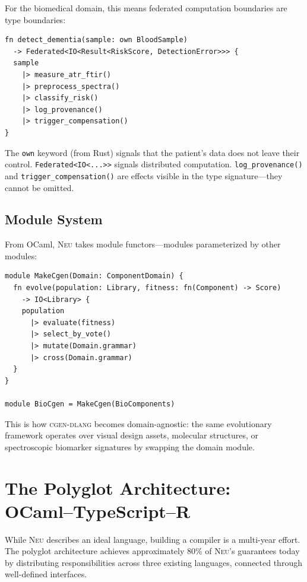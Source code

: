 \documentclass[11pt,letterpaper]{article}
\newcommand{\neu}{\textsc{Neu}}
\newcommand{\cgen}{\textsc{cgen-dlang}}
\begin{document}
For the biomedical domain, this means federated computation boundaries are type boundaries:

\begin{lstlisting}
fn detect_dementia(sample: own BloodSample)
  -> Federated<IO<Result<RiskScore, DetectionError>>> {
  sample
    |> measure_atr_ftir()
    |> preprocess_spectra()
    |> classify_risk()
    |> log_provenance()
    |> trigger_compensation()
}
\end{lstlisting}

The \texttt{own} keyword (from Rust) signals that the patient's data does not leave their control. \texttt{Federated<IO<...>>} signals distributed computation. \texttt{log\_provenance()} and \texttt{trigger\_compensation()} are effects visible in the type signature---they cannot be omitted.

\subsection{Module System}

From OCaml, \neu{} takes module functors---modules parameterized by other modules:

\begin{lstlisting}
module MakeCgen(Domain: ComponentDomain) {
  fn evolve(population: Library, fitness: fn(Component) -> Score)
    -> IO<Library> {
    population
      |> evaluate(fitness)
      |> select_by_vote()
      |> mutate(Domain.grammar)
      |> cross(Domain.grammar)
  }
}

module BioCgen = MakeCgen(BioComponents)
\end{lstlisting}

This is how \cgen{} becomes domain-agnostic: the same evolutionary framework operates over visual design assets, molecular structures, or spectroscopic biomarker signatures by swapping the domain module.

\section{The Polyglot Architecture: OCaml--TypeScript--R}
\label{sec:polyglot}

While \neu{} describes an ideal language, building a compiler is a multi-year effort. The polyglot architecture achieves approximately 80\% of \neu{}'s guarantees today by distributing responsibilities across three existing languages, connected through well-defined interfaces.
\end{document}
